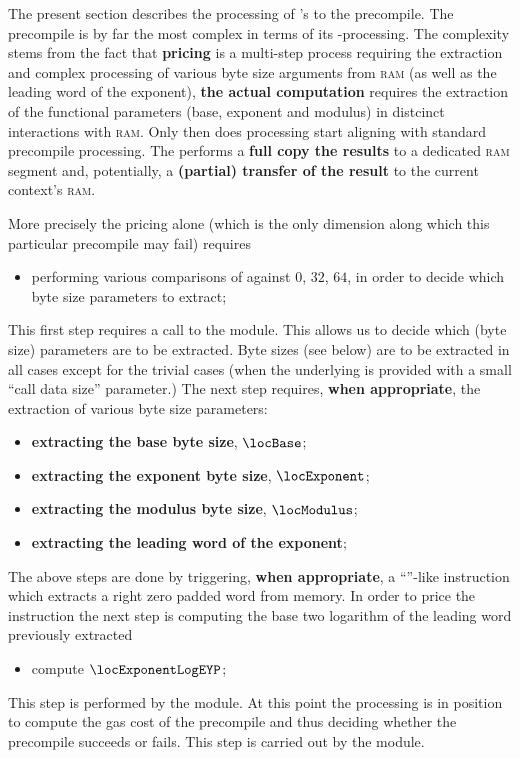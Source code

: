 The present section describes the processing of 's to the \instModexp{} precompile.
The \instModexp{} precompile is by far the most complex in terms of its \hubMod{}-processing.
The complexity stems from the fact that
\textbf{pricing} is a multi-step process requiring the extraction and complex processing of various byte size arguments from \textsc{ram} (as well as the leading word of the exponent),
\textbf{the actual computation} requires the extraction of the functional parameters (base, exponent and modulus) in distcinct interactions with \textsc{ram}.
Only then does processing start aligning with standard precompile processing.
The \zkEvm{} performs a \textbf{full copy the results} to a dedicated \textsc{ram} segment
and, potentially, a \textbf{(partial) transfer of the result} to the current context's \textsc{ram}.

More precisely the pricing alone (which is the only dimension along which this particular precompile may fail) requires
\begin{itemize}
	\item performing various comparisons of \locPrcCds{} against $0$, $32$, $64$, in order to decide which byte size parameters to extract;
\end{itemize}
This first step requires a call to the \oobMod{} module.
This allows us to decide which (byte size) parameters are to be extracted.
Byte sizes (see below) are to be extracted in all cases except for the trivial cases (when the underlying  is provided with a small ``call data size'' parameter.)
The next step requires, \textbf{when appropriate}, the extraction of various byte size parameters:
\begin{itemize}
	\item \textbf{extracting the base     byte size}, $\locBase$;
	\item \textbf{extracting the exponent byte size}, $\locExponent$;
	\item \textbf{extracting the modulus  byte size}, $\locModulus$;
	\item \textbf{extracting the leading  word of the exponent};
\end{itemize}
The above steps are done by triggering, \textbf{when appropriate}, a ``''-like instruction which extracts a right zero padded \evm{} word from memory.
In order to price the instruction the next step is computing the base two logarithm of the leading word previously extracted
\begin{itemize}
	\item compute $\locExponentLogEYP$;
\end{itemize}
This step is performed by the \expMod{} module.
At this point the processing is in position to compute the gas cost of the \instModexp{} precompile and thus deciding whether the precompile succeeds or fails.
This step is carried out by the \oobMod{} module.

